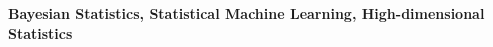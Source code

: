 \vspace*{10pt}

\textbf{Bayesian Statistics, Statistical Machine Learning, High-dimensional Statistics}




